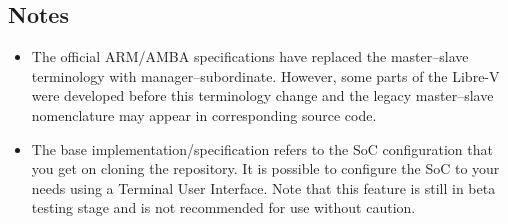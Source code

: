 \subsection*{Notes}
\begin{itemize}
  \item The official ARM/AMBA specifications have replaced the master--slave terminology with manager--subordinate. However, some parts of the Libre-V were developed before this terminology change and the legacy master--slave nomenclature may appear in corresponding source code.
  \item The base implementation/specification refers to the SoC configuration that you get on cloning the repository. It is possible to configure the SoC to your needs using a Terminal User Interface. Note that this feature is still in beta testing stage and is not recommended for use without caution. 
\end{itemize}
